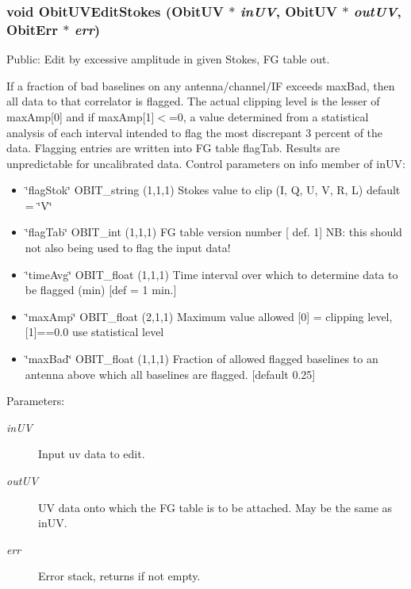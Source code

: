 \subsubsection{\setlength{\rightskip}{0pt plus 5cm}void Obit\-UVEdit\-Stokes ({\bf Obit\-UV} $\ast$ {\em in\-UV}, {\bf Obit\-UV} $\ast$ {\em out\-UV}, {\bf Obit\-Err} $\ast$ {\em err})}\label{ObitUVEdit_8h_a3}


Public: Edit by excessive amplitude in given Stokes, FG table out. 

If a fraction of bad baselines on any antenna/channel/IF exceeds max\-Bad, then all data to that correlator is flagged. The actual clipping level is the lesser of max\-Amp[0] and if max\-Amp[1]$<$=0, a value determined from a statistical analysis of each interval intended to flag the most discrepant 3 percent of the data. Flagging entries are written into FG table flag\-Tab. Results are unpredictable for uncalibrated data. Control parameters on info member of in\-UV: \begin{itemize}
\item \char`\"{}flag\-Stok\char`\"{} OBIT\_\-string (1,1,1) Stokes value to clip (I, Q, U, V, R, L) default = \char`\"{}V\char`\"{} \item \char`\"{}flag\-Tab\char`\"{} OBIT\_\-int (1,1,1) FG table version number [ def. 1] NB: this should not also being used to flag the input data! \item \char`\"{}time\-Avg\char`\"{} OBIT\_\-float (1,1,1) Time interval over which to determine data to be flagged (min) [def = 1 min.] \item \char`\"{}max\-Amp\char`\"{} OBIT\_\-float (2,1,1) Maximum value allowed [0] = clipping level, [1]==0.0 use statistical level \item \char`\"{}max\-Bad\char`\"{} OBIT\_\-float (1,1,1) Fraction of allowed flagged baselines to an antenna above which all baselines are flagged. [default 0.25]\end{itemize}
\begin{Desc}
\item[Parameters:]
\begin{description}
\item[{\em in\-UV}]Input uv data to edit. \item[{\em out\-UV}]UV data onto which the FG table is to be attached. May be the same as in\-UV. \item[{\em err}]Error stack, returns if not empty. \end{description}
\end{Desc}

